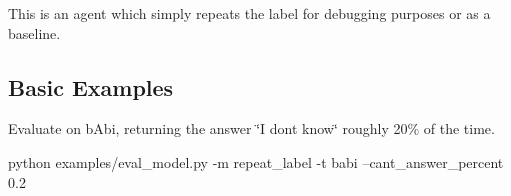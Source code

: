 This is an agent which simply repeats the label for debugging purposes or as a baseline.

\subsection*{Basic Examples}

Evaluate on b\+Abi, returning the answer \char`\"{}\+I don\textquotesingle{}t know\char`\"{} roughly 20\% of the time. 
\begin{DoxyCode}
python examples/eval\_model.py -m repeat\_label -t babi --cant\_answer\_percent 0.2
\end{DoxyCode}
 
